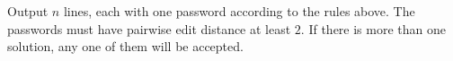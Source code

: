 
  Output $n$ lines, each with one password according to the rules above.
  The passwords must have pairwise edit distance at least $2$.
  If there is more than one solution, any one of them will be accepted.

